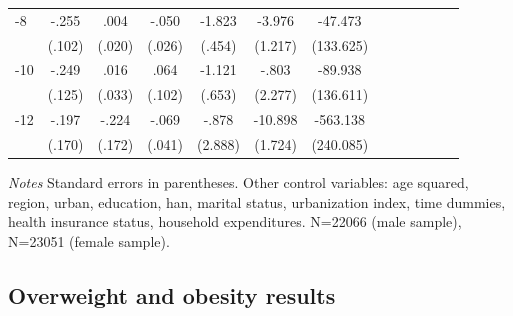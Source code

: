 \begin{table}[p]
\begin{adjustbox}{max width=\linewidth}
\begin{threeparttable}
{\begin{tabular}{l*{6}{SS}}
-8             &    -.255\sym{*}  &     .004         &    -.050         &   -1.823\sym{***}&   -3.976\sym{**} &  -47.473         \\
                &   (.102)         &   (.020)         &   (.026)         &   (.454)         &  (1.217)         &(133.625)         \\
-10            &    -.249\sym{*}  &     .016         &     .064         &   -1.121         &    -.803         &  -89.938         \\
                &   (.125)         &   (.033)         &   (.102)         &   (.653)         &  (2.277)         &(136.611)         \\
-12           &    -.197         &    -.224         &    -.069         &    -.878         &  -10.898\sym{***}& -563.138\sym{*}  \\
                &   (.170)         &   (.172)         &   (.041)         &  (2.888)         &  (1.724)         &(240.085)         \\      
\bottomrule
\end{tabular}
\begin{tablenotes}
\item \textit{Notes}   Standard errors in parentheses.
Other control variables: age squared, region, urban, education, han, marital status, urbanization index, time dummies, health insurance status, household expenditures. N=22066 (male sample), N=23051 (female sample).
\end{tablenotes}
}
\end{threeparttable}
\end{adjustbox}
\end{table}

\FloatBarrier
\clearpage




\subsection*{Overweight and obesity results}

